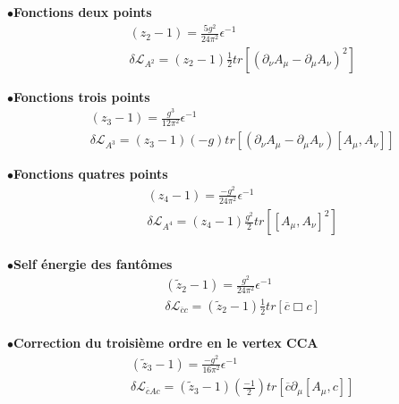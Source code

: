 \documentclass[a4paper,11pt]{article} %
\theoremstyle{plain}
\theoremstyle{definition}
\theoremstyle{remark}
\numberwithin{equation}{section}
\numberwithin{equation}{subsection}
\numberwithin{figure}{section}
\begin{document}
$\bullet$\hspace{1mm}\textbf{Fonctions deux points}
\begin{eqnarray*}
&&  (z_{2} - 1) =\frac{5g^2}{24 \pi^2} \epsilon^{-1} \\
&& \delta \mathcal{L}_{A^{2}} = (z_{2} - 1) \frac{1}{2} tr [ ( \partial_{\nu} A_{\mu} - \partial_{\mu} A_{\nu} )^2 ]
\end{eqnarray*}

$\bullet$\hspace{1mm}\textbf{Fonctions trois points}
\begin{eqnarray*}
&&  (z_{3} - 1) =\frac{g^3}{12 \pi^2} \epsilon^{-1} \\
&& \delta \mathcal{L}_{A^{3}} = (z_{3} - 1) (-g) tr [ ( \partial_{\nu} A_{\mu} - \partial_{\mu} A_{\nu} ) [A_{\mu},A_{\nu}] ]
\end{eqnarray*}

$\bullet$\hspace{1mm}\textbf{Fonctions quatres points}
\begin{eqnarray*}
&&  (z_{4} - 1) =\frac{-g^2}{24 \pi^2} \epsilon^{-1} \\
&& \delta \mathcal{L}_{A^{4}} = (z_{4} - 1) \frac{g^2}{2} tr [ [A_{\mu},A_{\nu}]^2  ]
\end{eqnarray*}\\

$\bullet$\hspace{1mm}\textbf{Self énergie des fantômes}
\begin{eqnarray*}
&&  (\tilde{z}_{2} - 1) =\frac{g^2}{24 \pi^2} \epsilon^{-1} \\
&& \delta \mathcal{L}_{\overline{c}c} =  (\tilde{z}_{2} - 1) \frac{1}{2} tr [ \overline{c} \Box c ]
\end{eqnarray*}\\

$\bullet$\hspace{1mm}\textbf{Correction du troisième ordre en le vertex CCA}
\begin{eqnarray*}
&&  (\tilde{z}_{3} - 1) =\frac{-g^2}{16 \pi^2} \epsilon^{-1} \\
&& \delta \mathcal{L}_{\overline{c}Ac} =  (\tilde{z}_{3} - 1) ( \frac{-1}{2} ) tr [ \overline{c} \partial_{\mu} [A_{\mu}, c] ]
\end{eqnarray*}\\
\end{document}
